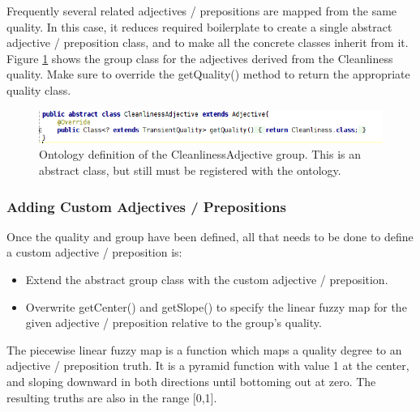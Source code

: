 \documentclass[titlepage]{article}
\begin{document}
Frequently several related adjectives / prepositions are mapped from the same quality.
In this case, it reduces required boilerplate to create a single abstract adjective / preposition class, and to make all the concrete classes inherit from it.
Figure \ref{fig:group_abstract_adjective} shows the group class for the adjectives derived from the Cleanliness quality.
Make sure to override the getQuality() method to return the appropriate quality class.

\begin{figure}[h!]
\centering
\includegraphics[width=\textwidth]{GroupAbstractAdjective}
\caption{Ontology definition of the CleanlinessAdjective group.
This is an abstract class, but still must be registered with the ontology.}
\label{fig:group_abstract_adjective}
\end{figure}


\subsubsection{Adding Custom Adjectives / Prepositions}

Once the quality and group have been defined, all that needs to be done to define a custom adjective / preposition is:
\begin{itemize}
\item Extend the abstract group class with the custom adjective / preposition.
\item Overwrite getCenter() and getSlope() to specify the linear fuzzy map for the given adjective / preposition relative to the group's quality.
\end{itemize}

The piecewise linear fuzzy map is a function which maps a quality degree to an adjective / preposition truth.
It is a pyramid function with value 1 at the center, and sloping downward in both directions until bottoming out at zero.
The resulting truths are also in the range [0,1].
\end{document}
